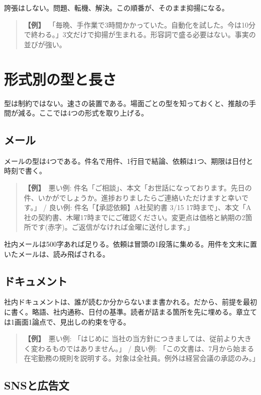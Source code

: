 \documentclass{article}
\begin{document}
誇張はしない。問題、転機、解決。この順番が、そのまま抑揚になる。

\begin{quote}
\textbf{【例】}\ 「毎晩、手作業で3時間かかっていた。自動化を試した。今は10分で終わる。」3文だけで抑揚が生まれる。形容詞で盛る必要はない。事実の並びが強い。
\end{quote}

\section{形式別の型と長さ}

型は制約ではない。速さの装置である。場面ごとの型を知っておくと、推敲の手間が減る。ここでは4つの形式を取り上げる。

\subsection{メール}

メールの型は4つである。件名で用件、1行目で結論、依頼は1つ、期限は日付と時刻で書く。

\begin{quote}
\textbf{【例】}\ 悪い例: 件名「ご相談」、本文「お世話になっております。先日の件、いかがでしょうか。進捗おりましたらご連絡いただけますと幸いです。」 / 良い例: 件名「【承認依頼】A社契約書 3/15 17時まで」、本文「A社の契約書、木曜17時までにご確認ください。変更点は価格と納期の2箇所です(赤字)。ご返信がなければ金曜に送付します。」
\end{quote}

社内メールは500字あれば足りる。依頼は冒頭の1段落に集める。用件を文末に置いたメールは、読み飛ばされる。

\subsection{ドキュメント}

社内ドキュメントは、誰が読むか分からないまま書かれる。だから、前提を最初に書く。略語、社内通称、日付の基準。読者が詰まる箇所を先に埋める。章立ては1画面1論点で、見出しの約束を守る。

\begin{quote}
\textbf{【例】}\ 悪い例: 「はじめに 当社の当方針につきましては、従前より大きく変わるものではありません。」 / 良い例: 「この文書は、7月から始まる在宅勤務の規則を説明する。対象は全社員。例外は経営会議の承認のみ。」
\end{quote}

\subsection{SNSと広告文}
\end{document}
